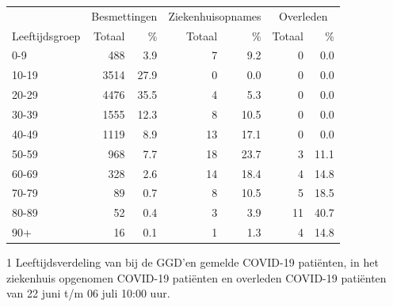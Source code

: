 \documentclass[
  english,
  man,floatsintext]{apa6}
\begin{document}
\begin{table}
\centering\begingroup\fontsize{11}{13}\selectfont

\begin{threeparttable}
\begin{tabular}{lrrrrrr}
\toprule
\multicolumn{1}{c}{ } & \multicolumn{2}{c}{Besmettingen} & \multicolumn{2}{c}{Ziekenhuisopnames} & \multicolumn{2}{c}{Overleden} \\
\cmidrule(l{3pt}r{3pt}){2-3} \cmidrule(l{3pt}r{3pt}){4-5} \cmidrule(l{3pt}r{3pt}){6-7}
Leeftijdsgroep & Totaal & \% & Totaal & \% & Totaal & \%\\
\midrule
0-9 & 488 & 3.9 & 7 & 9.2 & 0 & 0.0\\
10-19 & 3514 & 27.9 & 0 & 0.0 & 0 & 0.0\\
20-29 & 4476 & 35.5 & 4 & 5.3 & 0 & 0.0\\
30-39 & 1555 & 12.3 & 8 & 10.5 & 0 & 0.0\\
40-49 & 1119 & 8.9 & 13 & 17.1 & 0 & 0.0\\
50-59 & 968 & 7.7 & 18 & 23.7 & 3 & 11.1\\
60-69 & 328 & 2.6 & 14 & 18.4 & 4 & 14.8\\
70-79 & 89 & 0.7 & 8 & 10.5 & 5 & 18.5\\
80-89 & 52 & 0.4 & 3 & 3.9 & 11 & 40.7\\
90+ & 16 & 0.1 & 1 & 1.3 & 4 & 14.8\\
\bottomrule
\end{tabular}
\begin{tablenotes}
\item[1] Leeftijdsverdeling van bij de GGD’en gemelde COVID-19 patiënten, in het ziekenhuis opgenomen COVID-19 patiënten en overleden COVID-19 patiënten van 22 juni t/m 06 juli 10:00 uur.
\end{tablenotes}
\end{threeparttable}
\endgroup{}
\end{table}

\newpage
\end{document}

